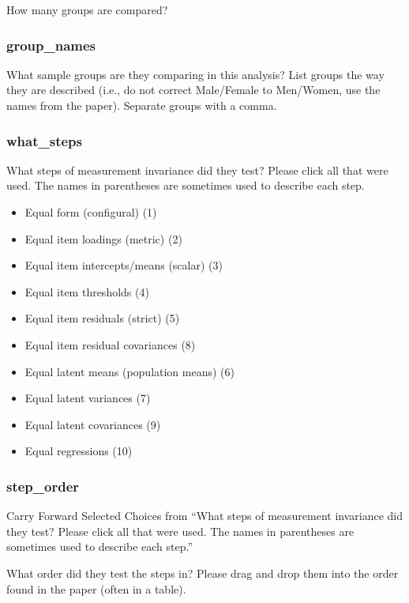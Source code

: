 \documentclass[
  man]{apa7}
\providecommand{\tightlist}{%
  \setlength{\itemsep}{0pt}\setlength{\parskip}{0pt}}
\begin{document}
How many groups are compared?

\subsubsection{group\_names}\label{group_names}

What sample groups are they comparing in this analysis? List groups the way they are described (i.e., do not correct Male/Female to Men/Women, use the names from the paper). Separate groups with a comma.

\subsubsection{what\_steps}\label{what_steps}

What steps of measurement invariance did they test? Please click all that were used. The names in parentheses are sometimes used to describe each step.

\begin{itemize}
\tightlist
\item
  Equal form (configural) (1)
\item
  Equal item loadings (metric) (2)
\item
  Equal item intercepts/means (scalar) (3)
\item
  Equal item thresholds (4)
\item
  Equal item residuals (strict) (5)
\item
  Equal item residual covariances (8)
\item
  Equal latent means (population means) (6)
\item
  Equal latent variances (7)
\item
  Equal latent covariances (9)
\item
  Equal regressions (10)
\end{itemize}

\subsubsection{step\_order}\label{step_order}

Carry Forward Selected Choices from ``What steps of measurement invariance did they test? Please click all that were used. The names in parentheses are sometimes used to describe each step.''

What order did they test the steps in? Please drag and drop them into the order found in the paper (often in a table).
\end{document}
